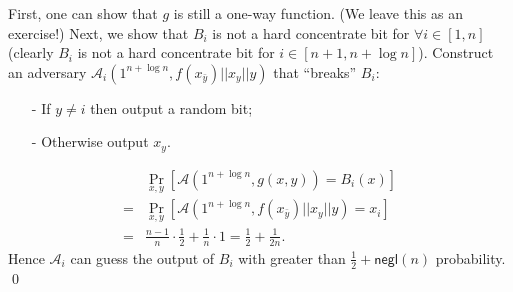 First, one can show that $g$ is still a one-way function. (We leave this as an exercise!)
Next, we show that $B_i$ is not a hard concentrate bit for $\forall i \in [1, n]$ (clearly $B_i$ is not a hard concentrate bit for $i \in [n+1, n+\log n]$).
Construct an adversary $\mathcal{A}_i(1^{n+\log n}, f(x_{\bar y}) || x_y || y)$ that ``breaks'' $B_i$:
\begin{itemize}
\item[-] If $y \not= i$ then output a random bit;
\item[-] Otherwise output $x_y$.
\end{itemize}
\begin{align*}
& \Pr_{x, y}[\mathcal{A}(1^{n+\log n}, g(x,y)) = B_i(x)]\\
=& \Pr_{x, y}[\mathcal{A}(1^{n+\log n}, f(x_{\bar y}) || x_y || y) = x_i]\\
=& \frac{n-1}{n} \cdot \frac{1}{2} + \frac{1}{n} \cdot 1 = \frac{1}{2} + \frac{1}{2n}.
\end{align*}
Hence $\mathcal{A}_i$ can guess the output of $B_i$ with greater than $\frac{1}{2} + \mathsf{negl}(n)$ probability.
\qed


\iffalse
\paragraph{Application: Coin tossing over the phone.} We next describe an application of hard concentrate bits to coin tossing.
Consider two parties trying to perform a coin tossing over the phone. In this setting the first party needs to declare its choice as the second one flips the coin. However, how can the first party trust the win/loss response from the second party?  In particular, if the first party calls out ``head'' and then the second party can just lie that it was ``tails.'' We can use hard concentrate bit of a (one-to-one) one-way function to  enable this applications.

Let $f$ be a (one-to-one) one-way function and $B$ be a hard concentrate bit for $f$. Consider the following protocol:
\begin{itemize}
\item[-] Party $P_1$ samples $x$ from $\{0,1\}^n$ uniformly at random and sends $y$, where $y = f(x)$, to party $P_2$.
\item[-] $P_2$ sends back a random bit $b$ sampled from $\{0,1\}$.
\item[-] $P_1$ sends back $(x, B(x))$ to $P_2$. $P_2$ aborts if $f(x) \neq y$.
\item[-]  Both parties output $B(x)\oplus b$.
\end{itemize}
Note that $P_2$ cannot guess $B(x)$ with a non-negligible advantage than $1/2$ as he sends back his $b$.
On the other hand, $P_1$ cannot flip the value $B(x)$ once it has sent $f(x)$ to $P_2$ because $f$ is one-to-one.
\fi

